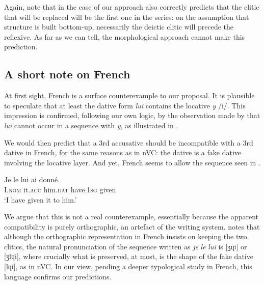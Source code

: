 \documentclass[output=paper,modfonts,nonflat,newtxmath,colorlinks,citecolor=brown]{langsci/langscibook}
\begin{document}
Again, note that in the case of  our approach also correctly predicts that the clitic that will be replaced will be the first one in the series: on the assumption that structure is built bottom-up, necessarily the deictic clitic will precede the reflexive. As far as we can tell, the morphological approach cannot make this prediction.

\subsection{A short note on French} %
\label{sec:cabre:3.3}

At first sight, French is a surface counterexample to our proposal. It is plausible to speculate that at least the dative form \textit{lui} contains the locative \textit{y} /i/. This impression is confirmed, following our own logic, by the observation made by \citet{Rezac2010} that \textit{lui} cannot occur in a sequence with \textit{y}, as illustrated in .

 \z

We would then predict that a 3rd accusative should be incompatible with a 3rd dative in French, for the same reasons as in nVC: the dative is a fake dative involving the locative layer. And yet, French seems to allow the sequence seen in . %

\ea%
    \label{ex:cabre:30}
    \gll Je le     lui    ai     donné.\\
         I.\textsc{nom} it.\textsc{acc} him.\textsc{dat}   have.\textsc{1sg} given\\
    \glt `I have given it to him.'
    \z

We argue that this is not a real counterexample, essentially because the apparent compatibility is purely orthographic, an artefact of the writing system. \citet{Schwarze2001} notes that although the orthographic representation in French insists on keeping the two clitics, the natural pronunciation of the sequence written as \textit{je} \textit{le} \textit{lui} is [ʒɥi] or [ʒlɥi], where crucially what is preserved, at most, is the shape of the fake dative [lɥi], as in nVC. In our view, pending a deeper typological study in French, this language confirms our predictions. 
\end{document}
